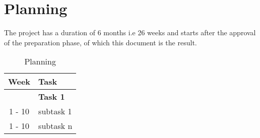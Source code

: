 \section{Planning}
The project has a duration of 6 months i.e 26 weeks and starts after the approval of the preparation phase, of which this document is the result.

\begin{table}[htb]
	\centering
	\begin{tabular}{cl}
		\hline
		\textbf{Week} 	& \textbf{Task} \\
		\hline
						& \textbf{Task 1} \\
		1 - 10			& subtask 1 \\
		1 - 10			& subtask n \\
		\hline
	\end{tabular}
	\caption{Planning}
	\label{tab:planning}
\end{table}
